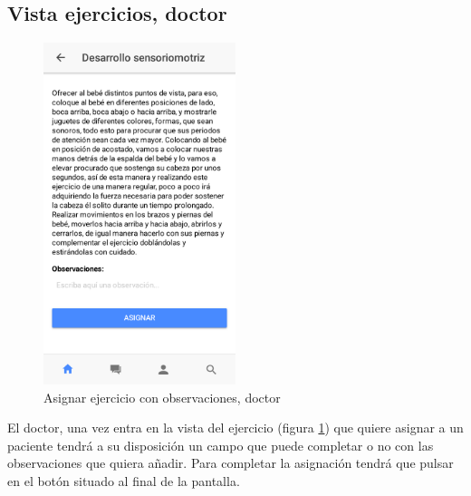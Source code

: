 \subsection{Vista ejercicios, doctor}
\begin{figure}[!h]
    \centering
    \includegraphics[width=0.5\textwidth]{images/screenshots/Doctor-anadir-observacion.png}
    \caption{Asignar ejercicio con observaciones, doctor}
    \label{asignar-ejercicio-con-observaciones}
\end{figure}

El doctor, una vez entra en la vista del ejercicio
(figura \ref{asignar-ejercicio-con-observaciones}) que quiere asignar a un
paciente tendrá a su disposición un campo que puede completar o no con las
observaciones que quiera añadir. Para completar la asignación tendrá que
pulsar en el botón situado al final de la pantalla.
\clearpage


